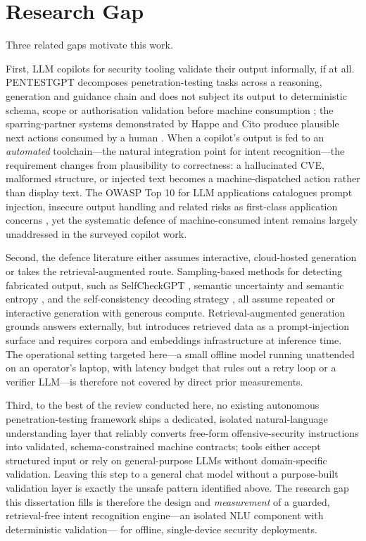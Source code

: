 \section{Research Gap}\label{sec:research-gap}

Three related gaps motivate this work.

First, LLM copilots for security tooling validate their output informally, if at
all. PENTESTGPT decomposes penetration-testing tasks across a reasoning,
generation and guidance chain and does not subject its output to deterministic schema, scope
or authorisation validation before machine consumption
\parencite{deng2024pentestgpt}; the sparring-partner systems demonstrated by
Happe and Cito produce plausible next actions consumed by a human
\parencite{happe2023pwned}. When a copilot's output is fed to an
\emph{automated} toolchain---the natural integration point for intent
recognition---the requirement changes from plausibility to correctness: a
hallucinated CVE, malformed structure, or injected text becomes a
machine-dispatched action rather than display text. The OWASP Top 10 for LLM
applications catalogues prompt injection, insecure output handling and related
risks as first-class application concerns \parencite{owasp2025}, yet the
systematic defence of machine-consumed intent remains largely unaddressed in the
surveyed copilot work.

Second, the defence literature either assumes interactive, cloud-hosted
generation or takes the retrieval-augmented route. Sampling-based methods for
detecting fabricated output, such as SelfCheckGPT \parencite{manakul2023selfcheckgpt},
semantic uncertainty \parencite{kuhn2023semantic} and semantic entropy
\parencite{farquhar2024semantic}, and the self-consistency decoding strategy
\parencite{wang2023selfconsistency}, all assume repeated or interactive
generation with generous compute. Retrieval-augmented generation
\parencite{lewis2020rag} grounds answers externally, but introduces retrieved
data as a prompt-injection surface \parencite{greshake2023indirect} and requires
corpora and embeddings infrastructure at inference time. The operational setting
targeted here---a small offline model running unattended on an operator's
laptop, with latency budget that rules out a retry loop or a verifier LLM---is
therefore not covered by direct prior measurements.

Third, to the best of the review conducted here, no existing
autonomous penetration-testing framework ships a dedicated, isolated
natural-language understanding layer that reliably converts free-form
offensive-security instructions into validated, schema-constrained machine contracts; tools either accept structured input or
rely on general-purpose LLMs without domain-specific validation. Leaving this
step to a general chat model without a purpose-built validation layer is exactly
the unsafe pattern identified above. The research gap this dissertation fills is
therefore the design and \emph{measurement} of a guarded, retrieval-free intent
recognition engine---an isolated NLU component with deterministic validation---
for offline, single-device security deployments.